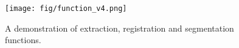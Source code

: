 \begin{figure}[t]
  \centering
  \texttt{[image: fig/function\_v4.png]}
  \vspace{-12pt}
  \caption{A demonstration of extraction, registration and segmentation functions.}
  \label{fig:formulation}
  \vspace{-15pt}
\end{figure}